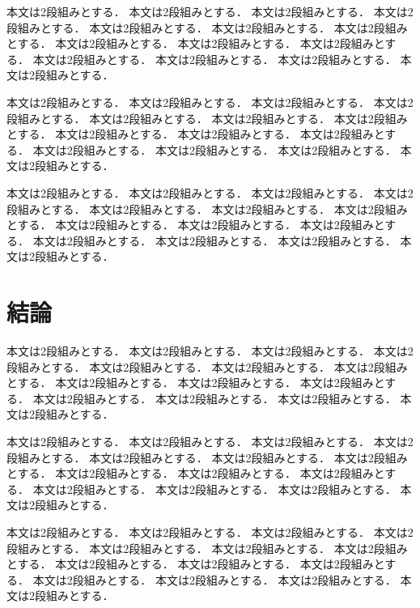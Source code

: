 \documentclass{/workdir/classes/summary}
\begin{document}
本文は2段組みとする．
本文は2段組みとする．
本文は2段組みとする．
本文は2段組みとする．
本文は2段組みとする．
本文は2段組みとする．
本文は2段組みとする．
本文は2段組みとする．
本文は2段組みとする．
本文は2段組みとする．
本文は2段組みとする．
本文は2段組みとする．
本文は2段組みとする．
本文は2段組みとする．

本文は2段組みとする．
本文は2段組みとする．
本文は2段組みとする．
本文は2段組みとする．
本文は2段組みとする．
本文は2段組みとする．
本文は2段組みとする．
本文は2段組みとする．
本文は2段組みとする．
本文は2段組みとする．
本文は2段組みとする．
本文は2段組みとする．
本文は2段組みとする．
本文は2段組みとする．

本文は2段組みとする．
本文は2段組みとする．
本文は2段組みとする．
本文は2段組みとする．
本文は2段組みとする．
本文は2段組みとする．
本文は2段組みとする．
本文は2段組みとする．
本文は2段組みとする．
本文は2段組みとする．
本文は2段組みとする．
本文は2段組みとする．
本文は2段組みとする．
本文は2段組みとする．

\section{結論}
本文は2段組みとする．
本文は2段組みとする．
本文は2段組みとする．
本文は2段組みとする．
本文は2段組みとする．
本文は2段組みとする．
本文は2段組みとする．
本文は2段組みとする．
本文は2段組みとする．
本文は2段組みとする．
本文は2段組みとする．
本文は2段組みとする．
本文は2段組みとする．
本文は2段組みとする．

本文は2段組みとする．
本文は2段組みとする．
本文は2段組みとする．
本文は2段組みとする．
本文は2段組みとする．
本文は2段組みとする．
本文は2段組みとする．
本文は2段組みとする．
本文は2段組みとする．
本文は2段組みとする．
本文は2段組みとする．
本文は2段組みとする．
本文は2段組みとする．
本文は2段組みとする．

本文は2段組みとする．
本文は2段組みとする．
本文は2段組みとする．
本文は2段組みとする．
本文は2段組みとする．
本文は2段組みとする．
本文は2段組みとする．
本文は2段組みとする．
本文は2段組みとする．
本文は2段組みとする．
本文は2段組みとする．
本文は2段組みとする．
本文は2段組みとする．
本文は2段組みとする．



\end{document}
